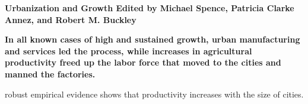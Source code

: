  \vspace{1cm}
\textbf{Urbanization and Growth Edited by Michael Spence, Patricia Clarke Annez, and Robert M. Buckley}

 \textbf{In all known cases of high and sustained growth, urban manufacturing and services led the process, while increases in agricultural productivity freed up the labor force that moved to the cities and manned the factories. }

 robust empirical evidence shows that productivity increases with the size of cities. 

